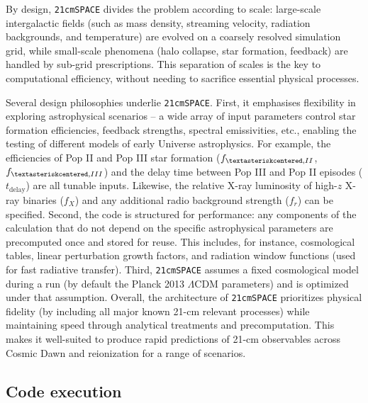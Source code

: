 \documentclass[floats,floatfix,showpacs,amssymb,prd,superscriptaddress,nofootinbib]{revtex4-2} %
\newcommand{\code}{\texttt}
\newcommand{\red}{\textcolor{red}}
\begin{document}
By design, \code{21cmSPACE} divides the problem according to scale: large-scale intergalactic fields (such as mass density, streaming velocity, radiation backgrounds, and temperature) are evolved on a coarsely resolved simulation grid, while small-scale phenomena (halo collapse, star formation, feedback) are handled by sub-grid prescriptions. 
This separation of scales is the key to computational efficiency, without needing to sacrifice essential physical processes.

Several design philosophies underlie \code{21cmSPACE}. First, it emphasises flexibility in exploring astrophysical scenarios -- a wide array of input parameters
control star formation efficiencies, feedback strengths, spectral emissivities, etc., enabling the testing of different models of early Universe astrophysics. For example, the efficiencies of Pop II  and Pop III star formation ($f_{\textasteriskcentered,II}$, $f_{\textasteriskcentered,III}$) and the delay time between Pop III and Pop II episodes ($t_{\text{delay}}$) are all tunable inputs. Likewise, the relative X-ray luminosity of high-$z$ X-ray binaries ($f_X$) and any additional radio background strength ($f_r$) can be specified. Second, the code is structured for performance: any components of the calculation that do not depend on the specific astrophysical parameters are precomputed once and stored for reuse. This includes, for instance, cosmological tables, linear perturbation growth factors, and radiation window functions (used for fast radiative transfer). Third, \code{21cmSPACE} assumes a fixed cosmological model during a run (by default the Planck 2013 $\Lambda$CDM parameters) and is optimized under that assumption. 
Overall, the architecture of \code{21cmSPACE} prioritizes physical fidelity (by including all major known 21-cm relevant processes) while maintaining speed through analytical treatments and precomputation. This makes it well-suited to produce rapid predictions of 21-cm observables across Cosmic Dawn and reionization for a range of scenarios.


\subsection{Code execution}
\end{document}
